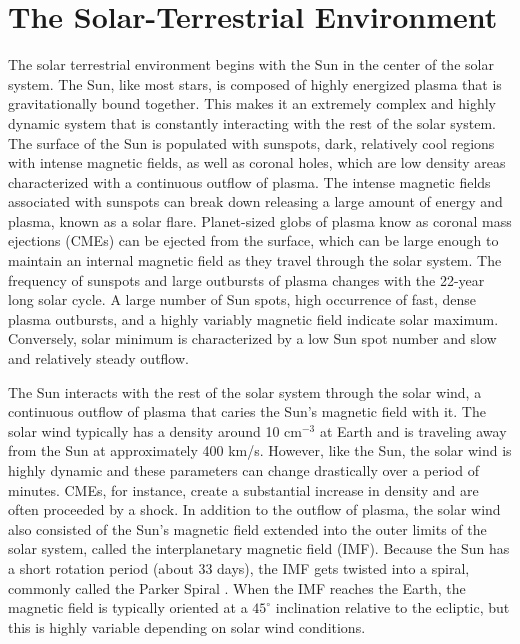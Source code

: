 
\section{The Solar-Terrestrial Environment}
The solar terrestrial environment begins with the Sun in the center of the solar system.  The Sun, like most stars, is composed of highly energized plasma that is gravitationally bound together.  This makes it an extremely complex and highly dynamic system that is constantly interacting with the rest of the solar system.  The surface of the Sun is populated with sunspots, dark, relatively cool regions with intense magnetic fields, as well as coronal holes, which are low density areas characterized with a continuous outflow of plasma.  The intense magnetic fields associated with sunspots can break down releasing a large amount of energy and plasma, known as a solar flare.  Planet-sized globs of plasma know as coronal mass ejections (CMEs) can be ejected from the surface, which can be large enough to maintain an internal magnetic field as they travel through the solar system.  The frequency of sunspots and large outbursts of plasma changes with the 22-year long solar cycle.  A large number of Sun spots, high occurrence of fast, dense plasma outbursts, and a highly variably magnetic field indicate solar maximum.  Conversely, solar minimum is characterized by a low Sun spot number and slow and relatively steady outflow.

The Sun interacts with the rest of the solar system through the solar wind, a continuous outflow of plasma that caries the Sun's magnetic field with it.  The solar wind typically has a density around 10 cm\(^{-3}\) at Earth and is traveling away from the Sun at approximately 400 km/s.  However, like the Sun, the solar wind is highly dynamic and these parameters can change drastically over a period of minutes.  CMEs, for instance, create a substantial increase in density and are often proceeded by a shock.  In addition to the outflow of plasma, the solar wind also consisted of the Sun's magnetic field extended into the outer limits of the solar system, called the interplanetary magnetic field (IMF).  Because the Sun has a short rotation period (about 33 days), the IMF gets twisted into a spiral, commonly called the Parker Spiral \citep{Parker1958}.  When the IMF reaches the Earth, the magnetic field is typically oriented at a \(45^\circ\) inclination relative to the ecliptic, but this is highly variable depending on solar wind conditions.


